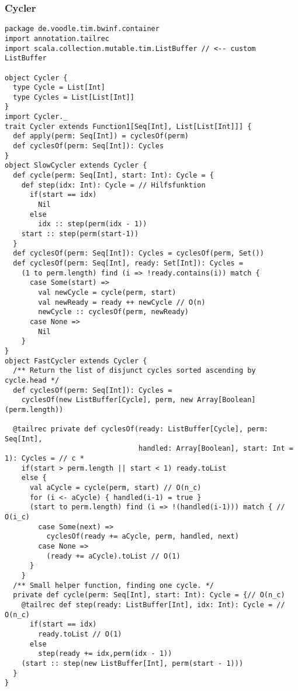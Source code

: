 \subsubsection{Cycler}
\lstset{basicstyle=\scriptsize}
\begin{lstlisting}
package de.voodle.tim.bwinf.container
import annotation.tailrec
import scala.collection.mutable.tim.ListBuffer // <-- custom ListBuffer

object Cycler {
  type Cycle = List[Int]
  type Cycles = List[List[Int]]
}
import Cycler._
trait Cycler extends Function1[Seq[Int], List[List[Int]]] {
  def apply(perm: Seq[Int]) = cyclesOf(perm)
  def cyclesOf(perm: Seq[Int]): Cycles
}
object SlowCycler extends Cycler {
  def cycle(perm: Seq[Int], start: Int): Cycle = {
    def step(idx: Int): Cycle = // Hilfsfunktion
      if(start == idx)
        Nil
      else
        idx :: step(perm(idx - 1))
    start :: step(perm(start-1))
  }
  def cyclesOf(perm: Seq[Int]): Cycles = cyclesOf(perm, Set())
  def cyclesOf(perm: Seq[Int], ready: Set[Int]): Cycles =
    (1 to perm.length) find (i => !ready.contains(i)) match {
      case Some(start) =>
        val newCycle = cycle(perm, start)
        val newReady = ready ++ newCycle // O(n)
        newCycle :: cyclesOf(perm, newReady)
      case None =>
        Nil
    }
}
object FastCycler extends Cycler {
  /** Return the list of disjunct cycles sorted ascending by cycle.head */
  def cyclesOf(perm: Seq[Int]): Cycles =
    cyclesOf(new ListBuffer[Cycle], perm, new Array[Boolean](perm.length))

  @tailrec private def cyclesOf(ready: ListBuffer[Cycle], perm: Seq[Int],
                                handled: Array[Boolean], start: Int = 1): Cycles = // c *
    if(start > perm.length || start < 1) ready.toList
    else {
      val aCycle = cycle(perm, start) // O(n_c)
      for (i <- aCycle) { handled(i-1) = true }
      (start to perm.length) find (i => !(handled(i-1))) match { // O(i_c)
        case Some(next) =>
          cyclesOf(ready += aCycle, perm, handled, next)
        case None =>
          (ready += aCycle).toList // O(1)
      }
    }
  /** Small helper function, finding one cycle. */
  private def cycle(perm: Seq[Int], start: Int): Cycle = {// O(n_c)
    @tailrec def step(ready: ListBuffer[Int], idx: Int): Cycle = // O(n_c)
      if(start == idx)
        ready.toList // O(1)
      else
        step(ready += idx,perm(idx - 1))
    (start :: step(new ListBuffer[Int], perm(start - 1)))
  }
}
\end{lstlisting}

